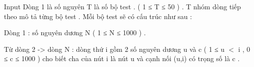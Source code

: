 Input
Dòng 1 là số nguyên T là số bộ test . (  1 ≤ T ≤ 50 ) . T nhóm dòng tiếp theo mô tả từng bộ test . Mỗi bộ test sẽ có cấu trúc như sau :   


   Dòng 1 : số nguyên dương N ( 1 ≤ N ≤ 1000 ) .   


   Từ dòng 2 -> dòng N : dòng thứ i gồm 2 số nguyên dương u và c ( 1 ≤ u $<$ i , 0 ≤ c ≤ 1000 ) cho biết cha của nút i là nút u và cạnh nối (u,i) có trọng số là c .